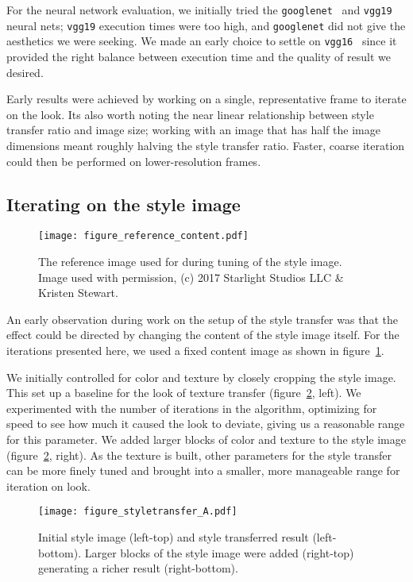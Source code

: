 \documentclass{acmsiggraph}
\begin{document}
For the neural network evaluation, we initially tried the \texttt{googlenet}~\cite{szegedy:2015} and \texttt{vgg19}~\cite{simonyan:2014} neural nets; \texttt{vgg19} execution times were too high, and \texttt{googlenet} did not give the aesthetics we were seeking. We made an early choice to settle on \texttt{vgg16}~\cite{simonyan:2014} since it provided the right balance between execution time and the quality of result we desired.

Early results were achieved by working on a single, representative frame to iterate on the look. Its also worth noting the near linear relationship between style transfer ratio and image size; working with an image that has half the image dimensions meant roughly halving the style transfer ratio. Faster, coarse iteration could then be performed on lower-resolution frames.

\subsection{Iterating on the style image}
\begin{figure}[ht]
  \centering
  \texttt{[image: figure\_reference\_content.pdf]}
  \caption{The reference image used for during tuning of the style image. Image used with permission, (c) 2017 Starlight Studios LLC \& Kristen Stewart.}
  \label{fig:reference_content}
\end{figure}

An early observation during work on the setup of the style transfer was that the effect could be directed by changing the content of the style image itself. For the iterations presented here, we used a fixed content image as shown in figure~\ref{fig:reference_content}.

We initially controlled for color and texture by closely cropping the style image. This set up a baseline for the look of texture transfer (figure~\ref{fig:styletransfer_A}, left). We experimented with the number of iterations in the algorithm, optimizing for speed to see how much it caused the look to deviate, giving us a reasonable range for this parameter. We added larger blocks of color and texture to the style image (figure~\ref{fig:styletransfer_A}, right). As the texture is built, other parameters for the style transfer can be more finely tuned and brought into a smaller, more manageable range for iteration on look.

\begin{figure}[ht]
  \centering
  \texttt{[image: figure\_styletransfer\_A.pdf]}
  \caption{Initial style image (left-top) and style transferred result (left-bottom). Larger blocks of the style image were added (right-top) generating a richer result (right-bottom).}
  \label{fig:styletransfer_A}
\end{figure}
\end{document}
